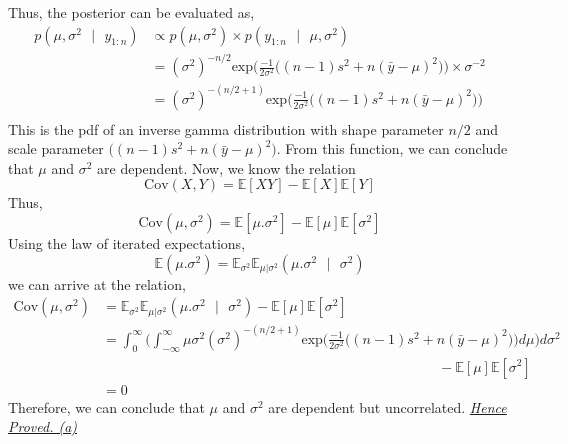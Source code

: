 \documentclass[11pt]{article}
\begin{document}
Thus, the posterior can be evaluated as,
\begin{equation}
  \nonumber
  \begin{aligned}
    p(\mu, \sigma^2 \text{ }| \text{ } y_{1:n}) & \propto p(\mu, \sigma^2) \times p(y_{1:n} \text{ } | \text{ }\mu, \sigma^2)\\
    & = (\sigma^2)^{-n/2}\text{exp}\bigg(\frac{-1}{2 \sigma^2}\big((n-1)s^2 + n(\bar{y} - \mu)^2\big)\bigg) \times \sigma^{-2}\\
    & = (\sigma^2)^{-(n/2+1)  }\text{exp}\bigg(\frac{-1}{2 \sigma^2}\big((n-1)s^2 + n(\bar{y} - \mu)^2\big)\bigg)\\
  \end{aligned}
\end{equation}
This is the pdf of an inverse gamma distribution with shape parameter $n/2$ and scale parameter $\big((n-1)s^2 + n(\bar{y} - \mu)^2\big)$. From this function, we can conclude that $\mu$ and $\sigma^2$ are dependent.
Now, we know the relation
\begin{equation}
  \nonumber
  \text{Cov}(X, Y) = \mathbb{E}[XY] - \mathbb{E}[X]\mathbb{E}[Y]
\end{equation}
Thus,
\begin{equation}
  \nonumber
  \text{Cov}(\mu, \sigma^2) = \mathbb{E}[\mu. \sigma^2] - \mathbb{E}[\mu]\mathbb{E}[\sigma^2]
\end{equation}
Using the law of iterated expectations,
\begin{equation}
  \nonumber
    \mathbb{E}(\mu.\sigma^{2}) = \mathbb{E}_{\sigma^{2}}\mathbb{E}_{\mu | \sigma^{2}}(\mu.\sigma^{2}\text{ }|\text{ } \sigma^{2})
\end{equation}
we can arrive at the relation,
\begin{equation}
  \nonumber
  \begin{aligned}
    \text{Cov}(\mu, \sigma^2) & = \mathbb{E}_{\sigma^{2}}\mathbb{E}_{\mu | \sigma^{2}}(\mu.\sigma^{2}\text{ }|\text{ } \sigma^{2}) - \mathbb{E}[\mu]\mathbb{E}[\sigma^2]\\
    & = \int_{0}^{\infty}\bigg(\int_{-\infty}^{\infty} \mu \sigma^{2} (\sigma^2)^{-(n/2+1)  }\text{exp}\bigg(\frac{-1}{2 \sigma^2}\big((n-1)s^2 + n(\bar{y} - \mu)^2\big)\bigg)  d\mu\bigg) d\sigma^{2}\\
      & \hspace{24em} - \mathbb{E}[\mu]\mathbb{E}[\sigma^2]\\
      & = 0
  \end{aligned}
\end{equation}
Therefore, we can conclude that $\mu$ and $\sigma^2$ are dependent but uncorrelated. \underline{\emph{Hence Proved. (a)}}\\ \\
\end{document}

